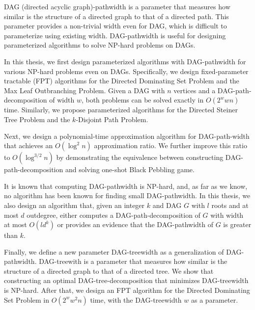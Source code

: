 \documentclass[master]{kuisthesis}		%
\theoremstyle{plain}
\theoremstyle{definition}
\begin{document}
\begin{eabstract}				%

DAG (directed acyclic graph)-pathwidth is a parameter that measures how similar is the structure of a directed graph to that of a directed path. This parameter provides a non-trivial width even for DAG, which is difficult to parameterize using existing width. DAG-pathwidth is useful for designing parameterized algorithms to solve NP-hard problems on DAGs.

In this thesis, we first design parameterized algorithms with DAG-pathwidth for various NP-hard problems even on DAGs. Specifically, we design fixed-parameter tractable (FPT) algorithms for the Directed Dominating Set Problem and the Max Leaf Outbranching Problem. Given a DAG with $n$ vertices and a DAG-path-decomposition of width $w$, both problems can be solved exactly in $O(2^w w n)$ time. Similarly, we propose parameterized algorithms for the Directed Steiner Tree Problem and the $k$-Disjoint Path Problem. 


Next, we design a polynomial-time approximation algorithm for DAG-path-width that achieves an $O(\log^2 n)$ approximation ratio. We further improve this ratio to $O(\log^{3/2} n)$ by demonstrating the equivalence between constructing DAG-path-decomposition and solving one-shot Black Pebbling game. 

It is known that computing DAG-pathwidth is NP-hard, and, as far as we know, no algorithm has been known for finding small DAG-pathwidth. In this thesis, we also design an algorithm that, given an integer $k$ and DAG $G$ with $l$ roots and at most $d$ outdegree, either computes a DAG-path-decomposition of $G$ with width at most $O(l d^k)$ or provides an evidence that the DAG-pathwidth of $G$ is greater than $k$.

Finally, we define a new parameter DAG-treewidth as a generalization of DAG-pathwidth. DAG-treewith is a parameter that measures how similar is the structure of a directed graph to that of a directed tree. We show that constructing an optimal DAG-tree-decomposition that minimizes DAG-treewidth is NP-hard. After that, we design an FPT algorithm for the Directed Dominating Set Problem in $O(2^w w^2 n)$ time, with the DAG-treewidth $w$ as a parameter.

\end{eabstract}
\end{document}
